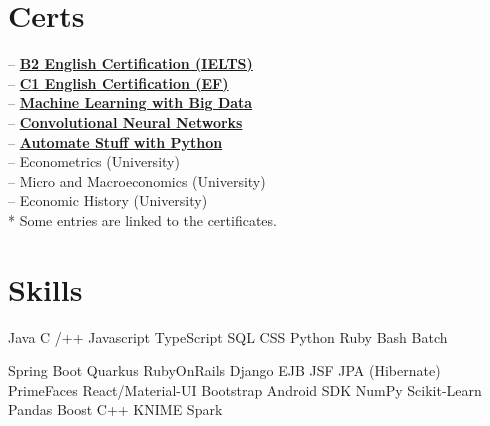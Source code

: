 \documentclass[]{CV-JuanCamiloFlorez}
\begin{document}
\begin{minipage}[t]{0.33\textwidth}
\section{Certs}
-- \textbf{\href{https://jcamilo.co/IELTS-2022.pdf}{B2 English Certification (IELTS)}} \\
-- \textbf{\href{https://www.efset.org/cert/j8ebfw}{C1 English Certification (EF)}} \\
-- \textbf{\href{https://www.coursera.org/account/accomplishments/certificate/8MS64GGYWDT5?utm_medium=certificate&utm_source=link&utm_campaign=copybutton_certificate}{Machine Learning with Big Data}} \\
-- \textbf{\href{https://www.coursera.org/account/accomplishments/certificate/KFN2XJC2KP92?utm_medium=certificate&utm_source=link&utm_campaign=copybutton_certificate}{Convolutional Neural Networks}} \\
-- \textbf{\href{https://www.udemy.com/certificate/UC-ZHLLMBQA}{Automate Stuff with Python}} \\
-- Econometrics (University) \\
-- Micro and Macroeconomics (University) \\
-- Economic History (University) \\
\smallskip
\scriptsize{* Some entries are linked to the certificates.}
\sectionsep


\section{Skills}
    \textbullet{} Java
    \textbullet{} C /++
    \textbullet{} Javascript
    \textbullet{} TypeScript
    \textbullet{} SQL
    \textbullet{} CSS
    \textbullet{} Python
    \textbullet{} Ruby
    \textbullet{} Bash
    \textbullet{} Batch

    \textbullet{} Spring Boot
    \textbullet{} Quarkus
    \textbullet{} RubyOnRails
    \textbullet{} Django
    \textbullet{} EJB JSF JPA (Hibernate) PrimeFaces
    \textbullet{} React/Material-UI
    \textbullet{} Bootstrap
    \textbullet{} Android SDK
    \textbullet{} NumPy
    \textbullet{} Scikit-Learn
    \textbullet{} Pandas
    \textbullet{} Boost C++
    \textbullet{} KNIME
    \textbullet{} Spark


\end{minipage}
\end{document}
